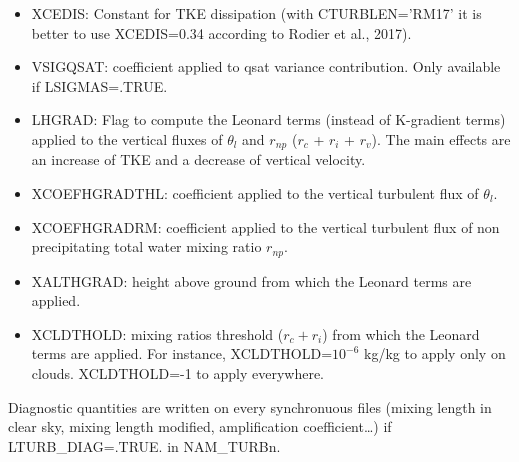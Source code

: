 \begin{itemize}
\item
{}
XCEDIS: Constant for TKE dissipation
(with CTURBLEN='RM17' it is better to use XCEDIS=0.34 according to Rodier et al., 2017).

\item
{}
VSIGQSAT: coefficient applied to qsat variance contribution. Only available if LSIGMAS=.TRUE.

\item
{}
LHGRAD: Flag to compute the Leonard terms (instead of K-gradient terms) applied to the vertical fluxes of $\theta_l$ and $r_{np}$ ($r_c$ + $r_i$ + $r_v$). The main effects are an increase of TKE and a decrease of vertical velocity.

\item
{}
XCOEFHGRADTHL: coefficient applied to the vertical turbulent flux of $\theta_l$.

\item
{}
XCOEFHGRADRM: coefficient applied to the vertical turbulent flux of non precipitating total water mixing ratio $r_{np}$.

\item
{}
XALTHGRAD: height above ground from which the Leonard terms are applied.

\item
{}
XCLDTHOLD: mixing ratios threshold ($r_c + r_i$) from which the Leonard terms are applied. For instance, XCLDTHOLD=$10^{-6}$ kg/kg to apply only on clouds. XCLDTHOLD=-1 to apply everywhere.

\end{itemize}

Diagnostic quantities are written on every synchronuous files 
(mixing length in clear sky, mixing length modified, amplification coefficient\ldots) if LTURB\_DIAG=.TRUE. in NAM\_TURBn.
